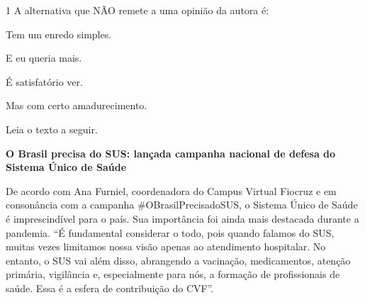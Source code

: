 \num{1} A alternativa que NÃO remete a uma opinião da autora é:

\begin{escolha}
\item Tem um enredo simples.
\item E eu queria mais.
\item É satisfatório ver.
\item Mas com certo amadurecimento. 
\end{escolha}



Leia o texto a seguir.

\begin{myquote}
\begin{center}
\textbf{O Brasil precisa do SUS: lançada campanha nacional de defesa do
Sistema Único de Saúde}
\end{center}

\noindent De acordo com Ana Furniel, coordenadora do Campus Virtual Fiocruz e em
consonância com a campanha \#OBrasilPrecisadoSUS, o Sistema Único de
Saúde é imprescindível para o país. Sua importância foi ainda mais
destacada durante a pandemia. ``É fundamental considerar o todo, pois
quando falamos do SUS, muitas vezes limitamos nossa visão apenas ao
atendimento hospitalar. No entanto, o SUS vai além disso, abrangendo a
vacinação, medicamentos, atenção primária, vigilância e, especialmente
para nós, a formação de profissionais de saúde. Essa é a esfera de
contribuição do CVF''.

\end{myquote}

